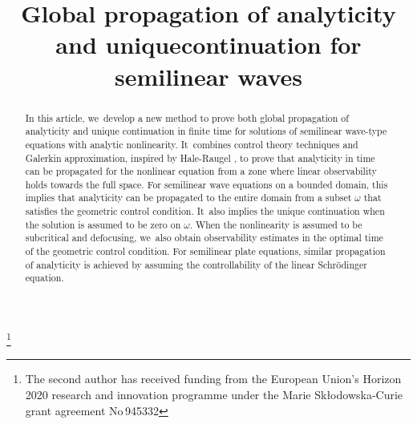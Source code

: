 \documentclass[JEP,XML,SOM,Unicode,published]{cedram}
\theoremstyle{definition}
\begin{document}
\title[Propagation results for semilinear waves]{Global propagation of analyticity and unique\nobreakspace continuation for semilinear waves}

\author[\initial{C.} \lastname{Laurent}]{ }
\address{CNRS UMR 9008, Université Reims-Champagne-Ardennes, Laboratoire de Mathématiques de Reims (LMR),\\
Moulin de la Housse-BP 1039, 51687 Reims cedex 2, France}

\author[\initial{C.} \lastname{Loyola}]{ }
\address{Sorbonne Université, Université Paris Cité, CNRS, Laboratoire Jacques-Louis Lions, LJLL,\\
F-75005 Paris, France}

\thanks{The second author has received funding from the European Union's Horizon 2020 research and innovation programme under the Marie Sk\l{}odowska-Curie grant agreement No\,945332}

\begin{abstract}
In this article, we~develop a new method to prove both global propagation of analyticity and unique continuation in finite time for solutions of semilinear wave-type equations with analytic nonlinearity. It~combines control theory techniques and Galerkin approximation, inspired by Hale-Raugel \cite{HR03}, to prove that analyticity in time can be propagated for the nonlinear equation from a zone where linear observability holds towards the full space. For semilinear wave equations on a bounded domain, this implies that analyticity can be propagated to the entire domain from a subset $\omega$ that satisfies the geometric control condition. It~also implies the unique continuation when the solution is assumed to be zero on $\omega$. When the nonlinearity is assumed to be subcritical and defocusing, we~also obtain observability estimates in the optimal time of the geometric control condition. For semilinear plate equations, similar propagation of analyticity is achieved by assuming the controllability of the linear Schrödinger equation.
\end{abstract}
\end{document}
